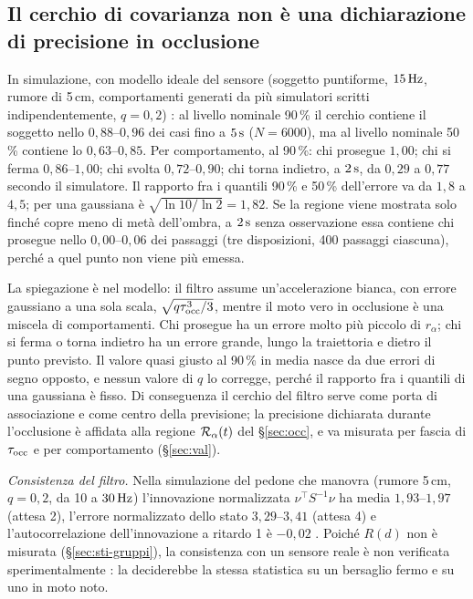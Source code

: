 \subsection{Il cerchio di covarianza non è una dichiarazione di precisione in occlusione}\label{sec:sti-cerchio}

In simulazione, con modello ideale del sensore (soggetto puntiforme, $15\,\mathrm{Hz}$, rumore di 5\,cm, comportamenti generati da più simulatori scritti indipendentemente, $q=0{,}2$) : al livello nominale 90\,\% il cerchio contiene il soggetto nello $0{,}88$--$0{,}96$ dei casi fino a $5\,\mathrm{s}$ ($N=6000$), ma al livello nominale 50\,\% contiene lo $0{,}63$--$0{,}85$. Per comportamento, al 90\,\%: chi prosegue $1{,}00$; chi si ferma $0{,}86$--$1{,}00$; chi svolta $0{,}72$--$0{,}90$; chi torna indietro, a $2\,\mathrm{s}$, da $0{,}29$ a $0{,}77$ secondo il simulatore. Il rapporto fra i quantili 90\,\% e 50\,\% dell'errore va da $1{,}8$ a $4{,}5$; per una gaussiana è $\sqrt{\ln10/\ln2}=1{,}82$. Se la regione viene mostrata solo finché copre meno di metà dell'ombra, a $2\,\mathrm{s}$ senza osservazione essa contiene chi prosegue nello $0{,}00$--$0{,}06$ dei passaggi (tre disposizioni, 400 passaggi ciascuna), perché a quel punto non viene più emessa.

La spiegazione è nel modello: il filtro assume un'accelerazione bianca, con errore gaussiano a una sola scala, $\sqrt{q\tau_{\mathrm{occ}}^3/3}$, mentre il moto vero in occlusione è una miscela di comportamenti. Chi prosegue ha un errore molto più piccolo di $r_\alpha$; chi si ferma o torna indietro ha un errore grande, lungo la traiettoria e dietro il punto previsto. Il valore quasi giusto al 90\,\% in media nasce da due errori di segno opposto, e nessun valore di $q$ lo corregge, perché il rapporto fra i quantili di una gaussiana è fisso. Di conseguenza il cerchio del filtro serve come porta di associazione e come centro della previsione; la precisione dichiarata durante l'occlusione è affidata alla regione $\mathcal{R}_\alpha(t)$ del \S\ref{sec:occ}, e va misurata per fascia di $\tau_{\mathrm{occ}}$ e per comportamento (\S\ref{sec:val}).

\emph{Consistenza del filtro.} Nella simulazione del pedone che manovra (rumore 5\,cm, $q=0{,}2$, da 10 a $30\,\mathrm{Hz}$) l'innovazione normalizzata $\nu^{\top}S^{-1}\nu$ ha media $1{,}93$--$1{,}97$ (attesa 2), l'errore normalizzato dello stato $3{,}29$--$3{,}41$ (attesa 4) e l'autocorrelazione dell'innovazione a ritardo 1 è $-0{,}02$ . Poiché $R(d)$ non è misurata (\S\ref{sec:sti-gruppi}), la consistenza con un sensore reale è non verificata sperimentalmente : la deciderebbe la stessa statistica su un bersaglio fermo e su uno in moto noto.

